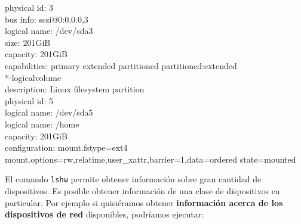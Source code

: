 \documentclass[12pt]{article}
\begin{document}
{{{{                   physical id: 3\\
                   bus info: scsi@0:0.0.0,3\\
                   logical name: /dev/sda3\\
                   size: 201GiB\\
                   capacity: 201GiB\\
                   capabilities: primary extended partitioned partitioned:extended\\
                 *-logicalvolume\\
                      description: Linux filesystem partition\\
                      physical id: 5\\
                      logical name: /dev/sda5\\
                      logical name: /home\\
                      capacity: 201GiB\\
                      configuration: mount.fstype=ext4 mount.options=rw,relatime,user\_xattr,barrier=1,data=ordered state=mounted\\
}
} \vspace*{0.5cm} } } 

El comando {\tt lshw} permite obtener información sobre gran cantidad de dispositivos.
Es posible obtener información de una clase de dispositivos en particular. Por ejemplo
si quisiéramos obtener {\bf información acerca de los dispositivos de red} disponibles,
podríamos ejecutar: 
\end{document}
